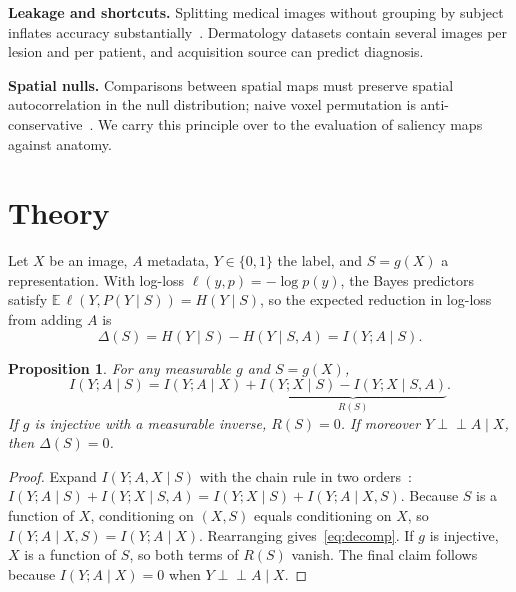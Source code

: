 \documentclass[conference]{IEEEtran}
\newtheorem{proposition}{Proposition}
\newcommand{\Ind}{\perp\!\!\!\perp}
\begin{document}
\textbf{Leakage and shortcuts.} Splitting medical images without grouping by subject inflates accuracy substantially~\cite{yagis2021leakage}. Dermatology datasets contain several images per lesion and per patient, and acquisition source can predict diagnosis.

\textbf{Spatial nulls.} Comparisons between spatial maps must preserve spatial autocorrelation in the null distribution; naive voxel permutation is anti-conservative~\cite{alexanderbloch2018,markello2022neuromaps}. We carry this principle over to the evaluation of saliency maps against anatomy.

\section{Theory}\label{sec:theory}
Let $X$ be an image, $A$ metadata, $Y\in\{0,1\}$ the label, and $S=g(X)$ a representation. With log-loss $\ell(y,p)=-\log p(y)$, the Bayes predictors satisfy $\mathbb{E}\,\ell(Y,P(Y\mid S))=H(Y\mid S)$, so the expected reduction in log-loss from adding $A$ is
\begin{equation}
\Delta(S)=H(Y\mid S)-H(Y\mid S,A)=I(Y;A\mid S).\label{eq:delta}
\end{equation}

\begin{proposition}\label{prop:decomp}
For any measurable $g$ and $S=g(X)$,
\begin{equation}
I(Y;A\mid S)=I(Y;A\mid X)+\underbrace{I(Y;X\mid S)-I(Y;X\mid S,A)}_{R(S)} .\label{eq:decomp}
\end{equation}
If $g$ is injective with a measurable inverse, $R(S)=0$. If moreover $Y\Ind A\mid X$, then $\Delta(S)=0$.
\end{proposition}
\begin{proof}
Expand $I(Y;A,X\mid S)$ with the chain rule in two orders~\cite{cover2006}: $I(Y;A\mid S)+I(Y;X\mid S,A)=I(Y;X\mid S)+I(Y;A\mid X,S)$. Because $S$ is a function of $X$, conditioning on $(X,S)$ equals conditioning on $X$, so $I(Y;A\mid X,S)=I(Y;A\mid X)$. Rearranging gives~\eqref{eq:decomp}. If $g$ is injective, $X$ is a function of $S$, so both terms of $R(S)$ vanish. The final claim follows because $I(Y;A\mid X)=0$ when $Y\Ind A\mid X$.
\end{proof}
\end{document}
